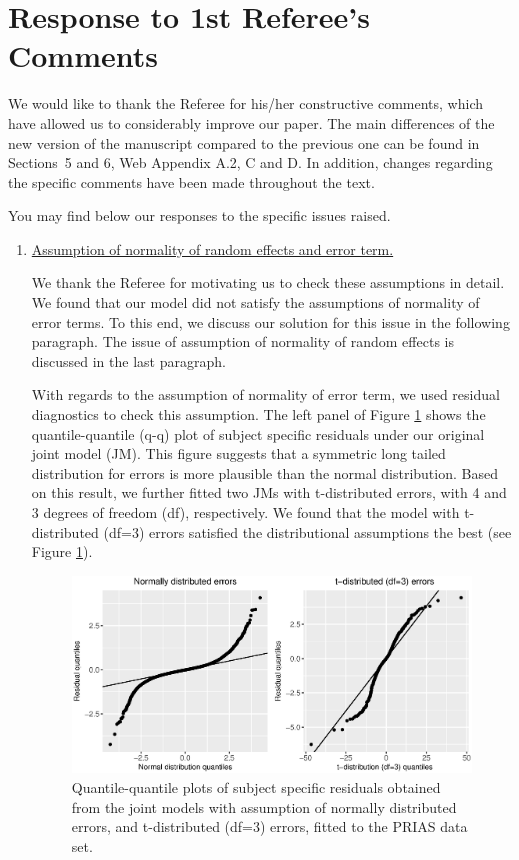 \clearpage
\section*{Response to 1st Referee's Comments}
We would like to thank the Referee for his/her constructive comments, which have allowed us to considerably improve our paper. The main differences of the new version of the manuscript compared to the previous one can be found in Sections~5 and 6, Web Appendix A.2, C and D. In addition, changes regarding the specific comments have been made throughout the text.

You may find below our responses to the specific issues raised.

\begin{enumerate}

	\item 
	\underline{Assumption of normality of random effects and error term.}

	We thank the Referee for motivating us to check these assumptions in detail. We found that our model did not satisfy the assumptions of normality of error terms. To this end, we discuss our solution for this issue in the following paragraph. The issue of assumption of normality of random effects is discussed in the last paragraph.

	With regards to the assumption of normality of error term, we used residual diagnostics to check this assumption. The left panel of Figure \ref{fig : qqplot_norm_t3} shows the quantile-quantile (q-q) plot of subject specific residuals under our original joint model (JM). This figure suggests that a symmetric long tailed distribution for errors is more plausible than the normal distribution. Based on this result, we further fitted two JMs with t-distributed errors, with 4 and 3 degrees of freedom (df), respectively. We found that the model with t-distributed (df=3) errors satisfied the distributional assumptions the best (see Figure \ref{fig : qqplot_norm_t3}). 

	\begin{figure}[!htb]
	\centerline{\includegraphics[width=\columnwidth]{images/model_fit/qqplot_norm_t3.eps}}
	\caption{Quantile-quantile plots of subject specific residuals obtained from the joint models with assumption of normally distributed errors, and t-distributed (df=3) errors, fitted to the PRIAS data set.}
	\label{fig : qqplot_norm_t3}
	\end{figure}


\end{enumerate}
